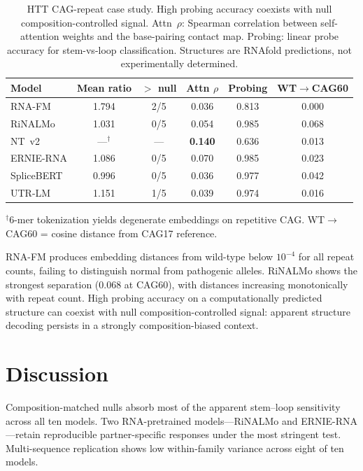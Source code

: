 \documentclass[11pt]{article}
\begin{document}
\begin{table}[htbp]
\centering
\caption{HTT CAG-repeat case study. High probing accuracy coexists with null
composition-controlled signal. Attn~$\rho$: Spearman correlation between
self-attention weights and the base-pairing contact map.
Probing: linear probe accuracy for stem-vs-loop classification.
Structures are RNAfold predictions, not experimentally determined.}
\label{tab:htt}
\begin{tabular}{@{}lccccc@{}}
\toprule
\textbf{Model} & \textbf{Mean ratio} & \textbf{$>$ null} &
  \textbf{Attn $\rho$} & \textbf{Probing} &
  \textbf{WT$\to$CAG60} \\
\midrule
RNA-FM     & 1.794 & 2/5  & 0.036 & 0.813 & 0.000 \\
RiNALMo    & 1.031 & 0/5  & 0.054 & 0.985 & 0.068 \\
NT~v2      & ---$^\dagger$ & ---   & \textbf{0.140} & 0.636 & 0.013 \\
ERNIE-RNA  & 1.086 & 0/5  & 0.070 & 0.985 & 0.023 \\
SpliceBERT & 0.996 & 0/5  & 0.036 & 0.977 & 0.042 \\
UTR-LM     & 1.151 & 1/5  & 0.039 & 0.974 & 0.016 \\
\bottomrule
\end{tabular}
\medskip

\small $^\dagger$6-mer tokenization yields degenerate embeddings on
repetitive CAG. WT$\to$CAG60 = cosine distance from CAG17 reference.
\end{table}

RNA-FM produces embedding distances from wild-type below $10^{-4}$ for all
repeat counts, failing to distinguish normal from pathogenic alleles.
RiNALMo shows the strongest separation (0.068 at CAG60), with distances
increasing monotonically with repeat count. High probing accuracy on a
computationally predicted structure can coexist with null
composition-controlled signal: apparent structure decoding persists in a
strongly composition-biased context.


\section{Discussion}
\label{sec:discussion}

Composition-matched nulls absorb most of the apparent stem--loop
sensitivity across all ten models. Two RNA-pretrained models---RiNALMo and
ERNIE-RNA---retain reproducible partner-specific responses under the most
stringent test. Multi-sequence replication shows low within-family
variance across eight of ten models.
\end{document}
